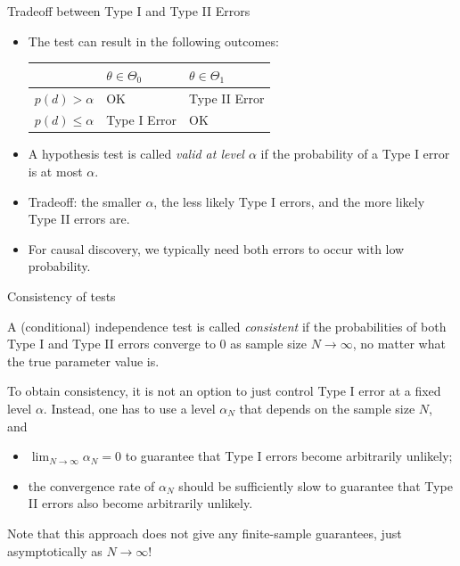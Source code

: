 \begin{frame}{Tradeoff between Type I and Type II Errors}
  \begin{itemize}
    \item The test can result in the following outcomes:
  \begin{center}\begin{tabular}{l|ll}
                      & $\theta \in \Theta_0$ & $\theta \in \Theta_1$ \\
    \hline
    $p(d) > \alpha$   & OK    & Type II Error \\
    $p(d) \le \alpha$ & Type I Error & OK 
  \end{tabular}\end{center}
    \item A hypothesis test is called \emph{valid at level $\alpha$} if the probability of a Type I error is at most $\alpha$.
    \item Tradeoff: the smaller $\alpha$, the less likely Type I errors, and the more likely Type II errors are.
    \item For causal discovery, we typically need both errors to occur with low probability.
  \end{itemize}
\end{frame}

\begin{frame}{Consistency of tests}
  \begin{Def}
  A (conditional) independence test is called \emph{consistent} if the probabilities of both Type I and Type II errors converge to 0 as sample size $N \to \infty$, no matter what the true parameter value is.
  \end{Def}

  To obtain consistency, it is not an option to just control Type I error at a fixed level $\alpha$. 
  Instead, one has to use a level $\alpha_N$ that depends on the sample size $N$, and 
    \begin{itemize}
      \item $\lim_{N\to\infty} \alpha_N = 0$ to guarantee that Type I errors become arbitrarily unlikely;
      \item the convergence rate of $\alpha_N$ should be sufficiently slow to guarantee that
        Type II errors also become arbitrarily unlikely.
    \end{itemize}
  Note that this approach does not give any finite-sample guarantees, just asymptotically as $N \to \infty$!
\end{frame}

